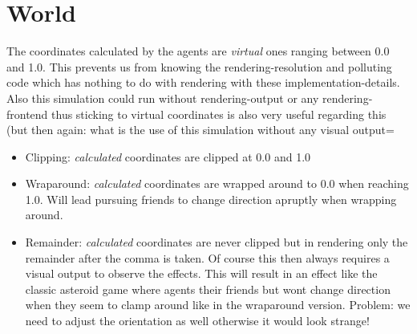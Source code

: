 \section{World}
The coordinates calculated by the agents are \textit{virtual} ones ranging between 0.0 and 1.0. This prevents us from knowing the rendering-resolution and polluting code which has nothing to do with rendering with these implementation-details. Also this simulation could run without rendering-output or any rendering-frontend thus sticking to virtual coordinates is also very useful regarding this (but then again: what is the use of this simulation without any visual output=

\begin{itemize}
\item Clipping: \textit{calculated} coordinates are clipped at 0.0 and 1.0 
\item Wraparound: \textit{calculated} coordinates are wrapped around to 0.0 when reaching 1.0. Will lead pursuing friends to change direction apruptly when wrapping around.
\item Remainder: \textit{calculated} coordinates are never clipped but in rendering only the remainder after the comma is taken. Of course this then always requires a visual output to observe the effects. This will result in an effect like the classic asteroid game where agents their friends but wont change direction when they seem to clamp around like in the wraparound version. Problem: we need to adjust the orientation as well otherwise it would look strange!
\end{itemize}
